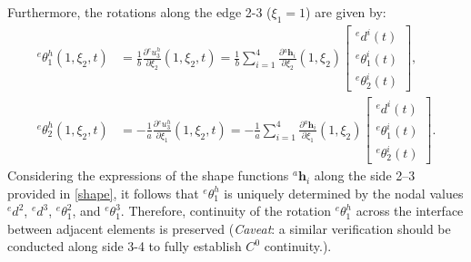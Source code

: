 \documentclass[12pt]{article}
\begin{document}
Furthermore, the rotations along the edge 2-3 ($\xi_1=1$) are given by:
\begin{align*}
    {}^e{\theta}_1^h(1,\xi_2,t) & =\frac{1}{b}\frac{\partial{}^eu_3^h}{\partial \xi_2}(1,\xi_2,t)=\frac{1}{b}\sum_{i=1}^4 \frac{\partial{}^a\mathbf{h}_i}{\partial \xi_2}(1,\xi_2) \begin{bmatrix}
                                                                                                                                                                                       {}^ed^i(t) \\[2pt] {}^e{\theta}^i_1(t) \\[2pt] {}^e{\theta}^i_2(t)
                                                                                                                                                                                   \end{bmatrix},   \\
    {}^e{\theta}_2^h(1,\xi_2,t) & =-\frac{1}{a}\frac{\partial{}^eu_3^h}{\partial \xi_1}(1,\xi_2,t)=-\frac{1}{a}\sum_{i=1}^4 \frac{\partial{}^a\mathbf{h}_i}{\partial \xi_1}(1,\xi_2) \begin{bmatrix}
                                                                                                                                                                                         {}^ed^i(t) \\[2pt] {}^e{\theta}^i_1(t) \\[2pt] {}^e{\theta}^i_2(t)
                                                                                                                                                                                     \end{bmatrix}.
\end{align*}
Considering the expressions of the shape functions \( {}^a\mathbf{h}_i \) along the side 2–3 provided in \eqref{shape}, it follows that \( {}^e \theta_1^h \) is uniquely determined by the nodal values \( {}^e d^2 \), \( {}^e d^3 \), \( {}^e \theta_1^2 \), and \( {}^e \theta_1^3 \). Therefore, continuity of the rotation \( {}^e \theta_1^h \) across the interface between adjacent elements is preserved (\emph{Caveat}: a similar verification should be conducted along side 3-4 to fully establish $C^0$ continuity.).
\end{document}
